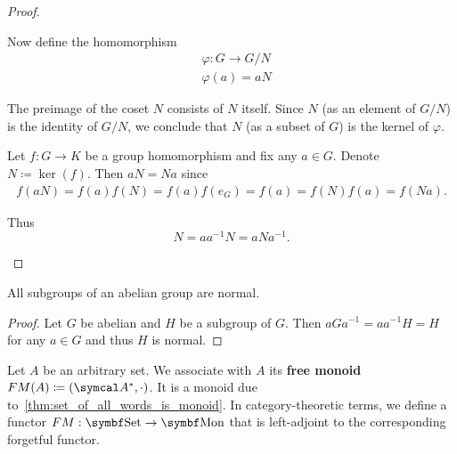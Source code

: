 \begin{proof}
\begin{description}
    Now define the homomorphism
    \begin{align*}
      &\varphi: G \to G / N \\
      &\varphi(a) = aN
    \end{align*}

    The preimage of the coset \( N \) consists of \( N \) itself. Since \( N \) (as an element of \( G / N \)) is the identity of \( G / N \), we conclude that \( N \) (as a subset of \( G \)) is the kernel of \( \varphi \).

     Let \( f: G \to K \) be a group homomorphism and fix any \( a \in G \). Denote \( N \coloneqq \ker(f) \). Then \( aN = Na \) since
    \begin{align*}
      f(aN)
      =
      f(a) f(N)
      =
      f(a) f(e_G)
      =
      f(a)
      =
      f(N) f(a)
      =
      f(Na).
    \end{align*}

    Thus
    \begin{equation*}
      N = aa^{-1}N = aNa^{-1}.
    \end{equation*}
  \end{description}
\end{proof}

\begin{proposition}\label{thm:abelian_normal_subgroups}
  All subgroups of an abelian group are normal.
\end{proposition}
\begin{proof}
  Let \( G \) be abelian and \( H \) be a subgroup of \( G \). Then \( aGa^{-1} = aa^{-1}H = H \) for any \( a \in G \) and thus \( H \) is normal.
\end{proof}

\begin{definition}\label{def:free_monoid}\cite[306]{Knapp2016BAlg}
  Let \( A \) be an arbitrary set. We associate with \( A \) its \textbf{free monoid} \( FM(A) \coloneqq (\Cal{A}^{*}, \cdot) \). It is a monoid due to~\cref{thm:set_of_all_words_is_monoid}. In category-theoretic terms, we define a functor \( FM: \Bold{Set} \to \Bold{Mon} \) that is left-adjoint to the corresponding forgetful functor.
\end{definition}

